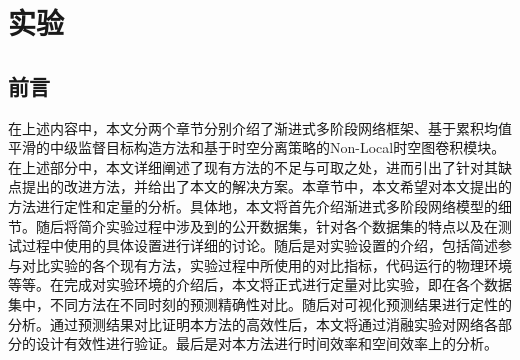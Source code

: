 \chapter{实验}
\section{前言}
在上述内容中，本文分两个章节分别介绍了渐进式多阶段网络框架、基于累积均值平滑的中级监督目标构造方法和基于时空分离策略的Non-Local时空图卷积模块。在上述部分中，本文详细阐述了现有方法的不足与可取之处，进而引出了针对其缺点提出的改进方法，并给出了本文的解决方案。本章节中，本文希望对本文提出的方法进行定性和定量的分析。具体地，本文将首先介绍渐进式多阶段网络模型的细节。随后将简介实验过程中涉及到的公开数据集，针对各个数据集的特点以及在测试过程中使用的具体设置进行详细的讨论。随后是对实验设置的介绍，包括简述参与对比实验的各个现有方法，实验过程中所使用的对比指标，代码运行的物理环境等等。在完成对实验环境的介绍后，本文将正式进行定量对比实验，即在各个数据集中，不同方法在不同时刻的预测精确性对比。随后对可视化预测结果进行定性的分析。通过预测结果对比证明本方法的高效性后，本文将通过消融实验对网络各部分的设计有效性进行验证。最后是对本方法进行时间效率和空间效率上的分析。

